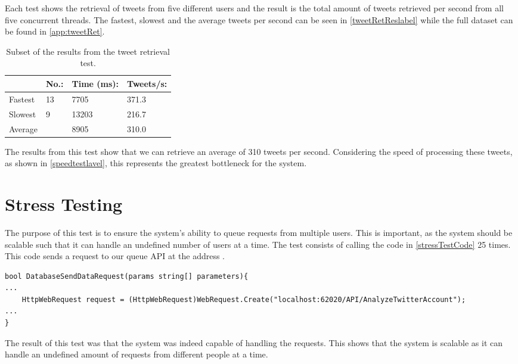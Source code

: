 Each test shows the retrieval of tweets from five different users and the
result is the total amount of tweets retrieved per second from all five
concurrent threads. The fastest, slowest and the average tweets per second can be seen in
\autoref{tweetRetReslabel} while the full dataset can be found in
\autoref{app:tweetRet}.

\begin{table}[H]\centering
\begin{tabular}{|l|l|l|l|}
\hline
\textbf{} & \textbf{No.:}	&	\textbf{Time (ms):}	&	\textbf{Tweets/s:} \\\hline
Fastest & 13	&	7705	&	371.3\\\hline
Slowest & 9	&	13203	&	216.7\\\hline
Average & 	&	8905	&	310.0 \\\hline
\end{tabular}
\caption{Subset of the results from the tweet retrieval test.}
\label{tweetRetReslabel}
\end{table}

The results from this test show that we can retrieve an average of 310 tweets
per second. Considering the speed of processing these tweets, as shown in
\autoref{speedtestlavel}, this represents the greatest bottleneck for the
system.
 
\section{Stress Testing}\label{test:stress}
The purpose of this test is to ensure the system's ability to queue requests
from multiple users. This is important, as the system should be scalable such
that it can handle an undefined number of users at a time. The test consists of
calling the code in \autoref{stressTestCode} 25 times. This code sends a request
to our queue API at the address .\nl

\begin{minipage}[H]{\linewidth}
\begin{lstlisting}[caption = Code initiating the stress test., label =
stressTestCode] 
bool DatabaseSendDataRequest(params string[] parameters){
...
	HttpWebRequest request = (HttpWebRequest)WebRequest.Create("localhost:62020/API/AnalyzeTwitterAccount");
...
}
\end{lstlisting}
\end{minipage}

The result of this test was that the system was indeed capable of handling
the requests. This shows that the system is scalable as it can handle an
undefined amount of requests from different people at a time.


